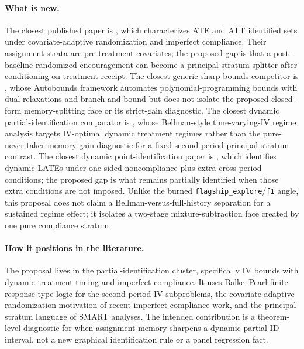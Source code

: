 \documentclass[11pt]{article}
\theoremstyle{definition}
\theoremstyle{plain}
\theoremstyle{remark}
\begin{document}
\paragraph{What is new.}
The closest published paper is \citet{BugniGaoObradovicVelez2024}, which characterizes ATE and ATT identified sets under covariate-adaptive randomization and imperfect compliance.  Their assignment strata are pre-treatment covariates; the proposed gap is that a post-baseline randomized encouragement can become a principal-stratum splitter after conditioning on treatment receipt.  The closest generic sharp-bounds competitor is \citet{DuarteFinkelsteinKnoxMummoloShpitser2024}, whose Autobounds framework automates polynomial-programming bounds with dual relaxations and branch-and-bound but does not isolate the proposed closed-form memory-splitting face or its strict-gain diagnostic.  The closest dynamic partial-identification comparator is \citet{ChenZhang2023}, whose Bellman-style time-varying-IV regime analysis targets IV-optimal dynamic treatment regimes rather than the pure-never-taker memory-gain diagnostic for a fixed second-period principal-stratum contrast.  The closest dynamic point-identification paper is \citet{SojitraSyrgkanis2024}, which identifies dynamic LATEs under one-sided noncompliance plus extra cross-period conditions; the proposed gap is what remains partially identified when those extra conditions are not imposed.  Unlike the burned \texttt{flagship\_explore}/\texttt{f1} angle, this proposal does not claim a Bellman-versus-full-history separation for a sustained regime effect; it isolates a two-stage mixture-subtraction face created by one pure compliance stratum.

\paragraph{How it positions in the literature.}
The proposal lives in the partial-identification cluster, specifically IV bounds with dynamic treatment timing and imperfect compliance.  It uses Balke--Pearl finite response-type logic for the second-period IV subproblems, the covariate-adaptive randomization motivation of recent imperfect-compliance work, and the principal-stratum language of SMART analyses.  The intended contribution is a theorem-level diagnostic for when assignment memory sharpens a dynamic partial-ID interval, not a new graphical identification rule or a panel regression fact.
\end{document}
